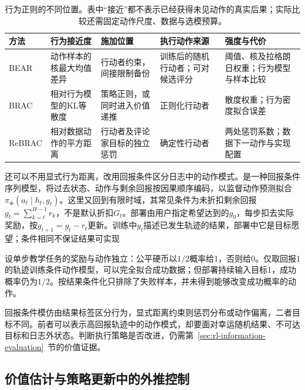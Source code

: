 \begin{table}[t]
  \centering
  \small
  \begin{tabularx}{\linewidth}{p{15mm}XXXX}
    \toprule
    方法 & 行为接近度 & 施加位置 & 执行动作来源 & 强度与代价 \\
    \midrule
    BEAR & 动作样本的核最大均值差异 & 行动者约束，间接限制备份 & 训练后的随机行动者；可对候选评分 & 阈值、核及拉格朗日权重；行为模型与样本比较 \\
    BRAC & 相对行为模型的KL等散度 & 策略正则，或同时进入价值递推 & 正则化行动者 & 散度权重；行为密度拟合误差 \\
    ReBRAC & 相对数据动作的平方距离 & 行动者及评论家目标的独立惩罚 & 确定性行动者 & 两处惩罚系数；数据下一动作与实现配置 \\
    \bottomrule
  \end{tabularx}
  \caption{行为正则的不同位置。表中“接近”都不表示已经获得未见动作的真实后果；实际比较还需固定动作尺度、数据与选模预算。}
  \label{tab:rl-information-behavior-methods}
\end{table}

还可以不用显式行为距离，改用回报条件区分日志中的动作模式。是一种回报条件序列模型，将过去状态、动作与剩余回报按因果顺序编码，以监督动作预测拟合$\pi_{\bm\phi}(a_t\mid h_t,g_t)$。这里又回到有限时域，其常见条件为未折扣剩余回报$g_t=\sum_{k=t}^{H-1}r_k$，不是默认折扣$G_t$。部署由用户指定希望达到的$g_0$，每步扣去实际奖励，按$g_{t+1}=g_t-r_t$更新。训练中$g_t$描述已发生轨迹的结果，部署中它是目标愿望；条件相同不保证结果可实现

\begin{example}[回报条件不能控制外部随机结果]
  \label{ex:rl-information-return-conditioning}
  设单步教学任务的奖励与动作独立：公平硬币以$1/2$概率给1，否则给0。仅取回报1的轨迹训练条件动作模型，可以完全拟合成功数据；但部署持续输入目标1，成功概率仍为$1/2$。按结果条件化只排除了失败样本，并未得到能够改变成功概率的动作。
\end{example}

回报条件模仿由结果标签区分行为，显式距离约束则惩罚分布或动作偏离，二者目标不同。前者可以表示高回报轨迹中的动作模式，却要面对幸运随机结果、不可达目标和日志外状态。判断执行策略是否改进，仍需第~\ref{sec:rl-information-evaluation}~节的价值证据。

\subsection{价值估计与策略更新中的外推控制}
\label{sec:rl-information-pessimism}

